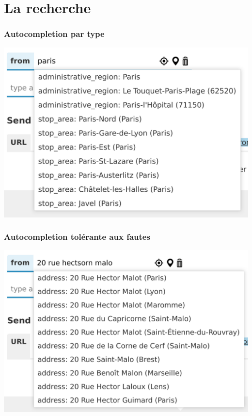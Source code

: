 \documentclass[table]{beamer}
\begin{document}
\section{La recherche}

\begin{frame}
  \frametitle{Autocompletion par type}

  \centering
  \includegraphics[width=0.7\linewidth]{images/autocomplete-paris}
\end{frame}

\begin{frame}
  \frametitle{Autocompletion tolérante aux fautes}

  \centering
  \includegraphics[width=0.7\linewidth]{images/autocomplete-typo}
\end{frame}
\end{document}
